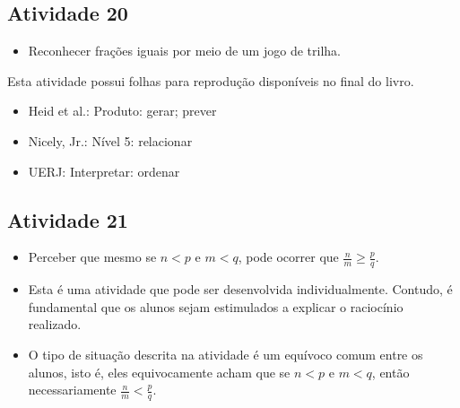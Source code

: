 %

\subsection{Atividade 20}

\begin{itemize} %
    \item       Reconhecer frações iguais por meio de um jogo de trilha.
\end{itemize} %


  Esta atividade possui folhas para reprodução disponíveis no final do
livro.

   \vspace{.1cm}

 \vspace{.1cm}

\begin{itemize} %
    \item       Heid et al.: Produto: gerar; prever
    \item       Nicely, Jr.: Nível 5: relacionar
    \item       UERJ: Interpretar: ordenar
\end{itemize} %

\newpage

\subsection{Atividade 21}

\begin{itemize} %
    \item       Perceber que mesmo se       $n < p$       e       $m < q$, pode
ocorrer que       $\frac{n}{m} \geq \frac{p}{q}$.
\end{itemize} %



\begin{itemize} %
    \item       Esta é uma atividade que pode ser desenvolvida individualmente.
Contudo, é fundamental que os alunos sejam estimulados a explicar o raciocínio
realizado.
    \item       O tipo de situação descrita na atividade é um equívoco comum
entre os alunos, isto é, eles equivocamente acham que se       $n < p$       e
    $m < q$, então necessariamente       $\frac{n}{m} < \frac{p}{q}$.
\end{itemize} %


